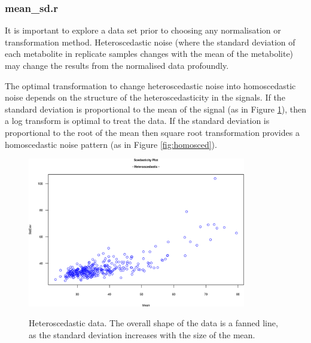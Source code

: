 \documentclass[english,a4paper,12pt]{article}
\begin{document}
\subsubsection*{mean\_sd.r}
It is important to explore a data set prior to choosing any normalisation or transformation method. Heteroscedastic noise (where the standard deviation of each metabolite in replicate samples changes with the mean of the metabolite) may change the results from the normalised data profoundly.

The optimal transformation to change heteroscedastic noise into homoscedastic noise depends on the structure of the heteroscedasticity in the signals. If the standard deviation is proportional to the mean of the signal (as in Figure \ref{fig:heterosced}), then a log transform is optimal to treat the data. If the standard deviation is proportional to the root of the mean then square root transformation provides a homoscedastic noise pattern (as in Figure \ref{fig:homosced}).

\begin{figure}[!hpt]
    \centering
    \includegraphics[width=0.85\textwidth]{images/heterosced.png} \\
    \caption[Heteroscedasticity]{Heteroscedastic data. The overall shape of the data is a fanned line, as the standard deviation increases with the size of the mean.}
    \label{fig:heterosced}
\end{figure}
\end{document}
